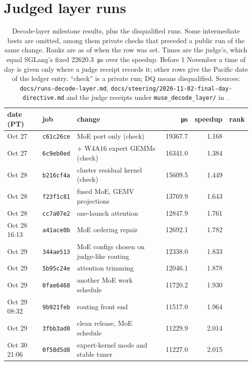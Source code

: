 \documentclass[11pt]{article}
\begin{document}
\section{Judged layer runs}
\begin{table}[h]
\centering
\caption{Decode-layer milestone results, plus the disqualified runs. Some
intermediate bests are omitted, among them private checks that preceded a public
run of the same change. Ranks are as of when the row was set. Times are the
judge's, which equal SGLang's fixed \SI{22620.3}{\micro\second} over the speedup.
Before 1 November a time of day is given only where a judge receipt records it;
other rows give the Pacific date of the ledger entry. ``check'' is a private run; DQ means disqualified. Sources: \texttt{docs/runs-decode-layer.md},
\texttt{docs/steering/2026-11-02-final-day-directive.md} and the judge receipts
under \texttt{muse\_decode\_layer/} in~\cite{repo}.}
\label{tab:timeline}
\small
\begin{tabular}{lllrrr}
\toprule
date (PT) & job & change & \si{\micro\second} & speedup & rank\\
\midrule
Oct 27 & \texttt{c61c26ce} & MoE port only (check) & \num{19367.7} & 1.168 & \\
Oct 27 & \texttt{6c9eb0ed} & + W4A16 expert GEMMs (check) & \num{16341.0} & 1.384 & \\
Oct 28 & \texttt{b216cf4a} & cluster residual kernel (check) & \num{15609.5} & 1.449 & \\
Oct 28 & \texttt{f23f1c81} & fused MoE, GEMV projections & \num{13769.9} & 1.643 & \\
Oct 28 & \texttt{cc7a07e2} & one-launch attention & \num{12847.9} & 1.761 & \\
Oct 28 16:13 & \texttt{a41ace0b} & MoE ordering repair & \num{12692.1} & 1.782 & \\
Oct 29 & \texttt{344ae513} & MoE configs chosen on judge-like routing & \num{12338.0} & 1.833 & \\
Oct 29 & \texttt{5b95c24e} & attention trimming & \num{12046.1} & 1.878 & \\
Oct 29 & \texttt{0fae6468} & another MoE work schedule & \num{11720.2} & 1.930 & \\
Oct 29 08:32 & \texttt{9b921feb} & routing front end & \num{11517.0} & 1.964 & \\
Oct 29 & \texttt{3fbb3ad0} & clean release, MoE schedule & \num{11229.9} & 2.014 & \\
Oct 30 21:06 & \texttt{0f58d5d8} & expert-kernel mode and stable tuner & \num{11227.0} & 2.015 & \\

\end{tabular}
\end{table}
\end{document}
